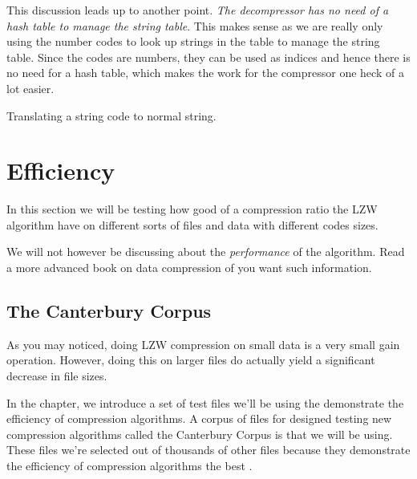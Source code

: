 \begin{refsection}
This discussion leads up to another point. \textit{The decompressor
  has no need of a hash table to manage the string table}. This makes sense as
we are really only using the number codes to look up strings in the
table to manage the string table. Since the codes are numbers, they
can be used as indices and hence there is no need for a hash table,
which makes the work for the compressor one heck of a lot easier.

\begin{algorithm}[H]
  \caption{Translating a string code to normal string.}
  \label{alg:translate-string-code}
  \begin{algorithmic}[1]
    \While{\True}

        \Break
      \Else
      \EndIf
    \EndWhile
  \end{algorithmic}
\end{algorithm}

\section{Efficiency}

In this section we will be testing how good of a compression ratio the
LZW algorithm have on different sorts of files and data with
different codes sizes.

We will not however be discussing about the \textit{performance} of
the algorithm. Read a more advanced book on data compression of you
want such information.

\subsection{The Canterbury Corpus}

As you may noticed, doing LZW compression on small data is a very small
gain operation. However, doing this on larger files do actually yield a
significant decrease in file sizes.

In the chapter, we introduce a set of test files we'll be using the
demonstrate the efficiency of compression algorithms. A corpus of
files for designed testing new compression algorithms called the
Canterbury Corpus is that we will be using. These files we're selected
out of thousands of other files because they demonstrate the
efficiency of compression algorithms the best \cite{arnold:corpus}.


\end{refsection}
